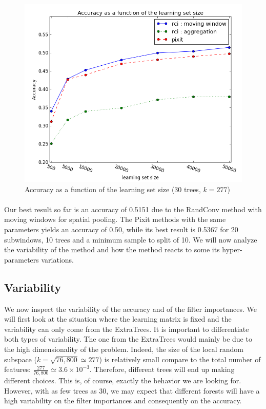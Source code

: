 \documentclass[a4paper]{report}
\begin{document}
		\begin{figure}
			\centering
				\includegraphics[width=1.0\textwidth]{images/accFLSsize.png}
			\caption{\label{fig:accFLSsize}Accuracy as a function of the learning set size (30 trees, $k=277$)}
		\end{figure}
		
		\paragraph{}
		Our best result so far is an accuracy of 0.5151 due to the RandConv method with moving windows for spatial pooling. The Pixit methods with the same parameters yields an accuracy of 0.50, while its best result is 0.5367 for 20 subwindows, 10 trees and a minimum sample to split of 10. We will now analyze the variability of the method and how the method reacts to some its hyper-parameters variations.
		
		\subsection{\label{subsec:ETDICVariability}Variability}
		We now inspect the variability of the accuracy and of the filter importances. We will first look at the situation where the learning matrix is fixed and the variability can only come from the ExtraTrees. It is important to differentiate both types of variability. The one from the ExtraTrees would mainly be due to the high dimensionality of the problem. Indeed, the size of the local random subspace ($k = \sqrt{76,800} \simeq 277$) is relatively small compare to the total number of features: $\frac{277}{76,800} \simeq 3.6 \times 10^{-3}$. Therefore, different trees will end up making different choices. This is, of course, exactly the behavior we are looking for. However, with as few trees as 30, we may expect that different forests will have a high variability on the filter importances and consequently on the accuracy.
		
\end{document}
